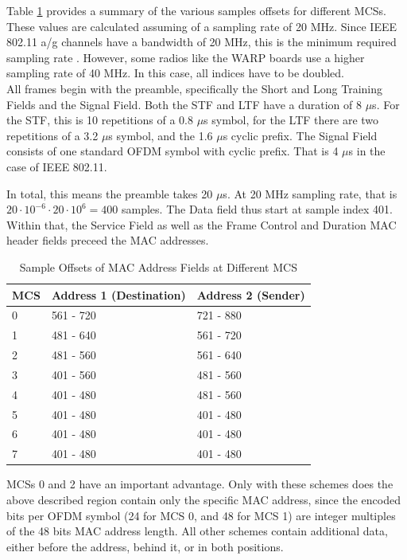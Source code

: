 Table \ref{tbl:sample-offsets} provides a summary of the various samples offsets for different \glspl{MCS}. These values are calculated assuming of a sampling rate of 20 MHz. Since IEEE 802.11 a/g channels have a bandwidth of 20 MHz, this is the minimum required sampling rate \cite{ieee2012}. However, some radios like the WARP boards use a higher sampling rate of 40 MHz. In this case, all indices have to be doubled.\\

All frames begin with the preamble, specifically the Short and Long Training Fields and the Signal Field. Both the STF and LTF have a duration of 8 $\mu$s. For the STF, this is 10 repetitions of a 0.8 $\mu$s symbol, for the LTF there are two repetitions of a 3.2 $\mu$s symbol, and the 1.6 $\mu$s cyclic prefix. The Signal Field consists of one standard \gls{OFDM} symbol with cyclic prefix. That is 4 $\mu$s in the case of IEEE 802.11.

In total, this means the preamble takes 20 $\mu$s. At 20 MHz sampling rate, that is $ 20 \cdot 10^{-6} \cdot 20 \cdot 10^6 = 400 $ samples. The Data field thus start at sample index 401. Within that, the Service Field as well as the Frame Control and Duration MAC header fields preceed the MAC addresses.\\

\begin{table}[ht]
	\centering
	\begin{tabular}{|p{2.5cm}|p{4.5cm}|p{4.5cm}|}
		\hline
		\textbf{MCS} & \textbf{Address 1 (Destination)} & \textbf{Address 2 (Sender)} \\ \hline
		0 & 561 - 720 & 721 - 880 \\ \hline
		1 & 481 - 640 & 561 - 720 \\ \hline
		2 & 481 - 560 & 561 - 640 \\ \hline
		3 & 401 - 560 & 481 - 560 \\ \hline
		4 & 401 - 480 & 481 - 560 \\ \hline
		5 & 401 - 480 & 401 - 480 \\ \hline
		6 & 401 - 480 & 401 - 480 \\ \hline
		7 & 401 - 480 & 401 - 480 \\ \hline
	\end{tabular}
	\caption{Sample Offsets of MAC Address Fields at Different MCS}
	\label{tbl:sample-offsets}
\end{table}

\glspl{MCS} 0 and 2 have an important advantage. Only with these schemes does the above described region contain only the specific MAC address, since the encoded bits per OFDM symbol (24 for MCS 0, and 48 for MCS 1) are integer multiples of the 48 bits MAC address length. All other schemes contain additional data, either before the address, behind it, or in both positions.


